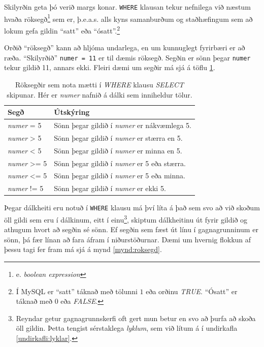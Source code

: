 Skilyrðin geta þó verið margs konar. \verb|WHERE| klausan tekur nefnilega við næstum hvaða röksegð\footnote{e. \emph{boolean expression}} sem er, þ.e.a.s. alls kyns samanburðum og staðhæfingum sem að lokum gefa gildin ``satt'' eða ``ósatt''.\footnote{Í MySQL er ``satt'' táknað með tölunni $1$ eða orðinu \emph{TRUE}. ``Ósatt'' er táknað með $0$ eða \emph{FALSE}.}

Orðið ``röksegð'' kann að hljóma undarlega, en um kunnuglegt fyrirbæri er að ræða. ``Skilyrðið'' \verb|numer = 11| er til dæmis röksegð. Segðin er sönn þegar \verb|numer| tekur gildið 11, annars ekki. Fleiri dæmi um segðir má sjá á töflu \ref{tafla:samanburdir}.

\begin{table}
\centering
\caption[Röksegðir]{Röksegðir sem nota mætti í \emph{WHERE} klausu \emph{SELECT} skipunar. Hér er \emph{numer} nafnið á dálki sem inniheldur tölur.}
\label{tafla:samanburdir}
\begin{tabular}{ll}
\toprule
Segð&Útskýring\\
\midrule
\emph{numer} = 5&Sönn þegar gildið í \emph{numer} er nákvæmlega 5.\\
\emph{numer} > 5&Sönn þegar gildið í \emph{numer} er stærra en 5.\\
\emph{numer} < 5&Sönn þegar gildið í \emph{numer} er minna en 5.\\
\emph{numer} >= 5&Sönn þegar gildið í \emph{numer} er 5 eða stærra.\\
\emph{numer} <= 5&Sönn þegar gildið í \emph{numer} er 5 eða minna.\\
\emph{numer} != 5&Sönn þegar gildið í \emph{numer} er ekki 5.\\
\bottomrule
\end{tabular}
\end{table}

Þegar dálkheiti eru notuð í \verb|WHERE| klausu má því líta á það sem svo að við skoðum öll gildi sem eru í dálkinum, eitt í einu\footnote{Reyndar getur gagnagrunnskerfi oft gert mun betur en svo að þurfa að skoða öll gildin. Þetta tengist sérstaklega \emph{lyklum}, sem við lítum á í undirkafla \ref{undirkafli:lyklar}.}, skiptum dálkheitinu út fyrir gildið og athugum hvort að segðin sé sönn. Ef segðin sem fæst út línu í gagnagrunninum er sönn, þá fær línan að fara áfram í niðurstöðurnar. Dæmi um hvernig flokkun af þessu tagi fer fram má sjá á mynd \ref{mynd:roksegd}.

